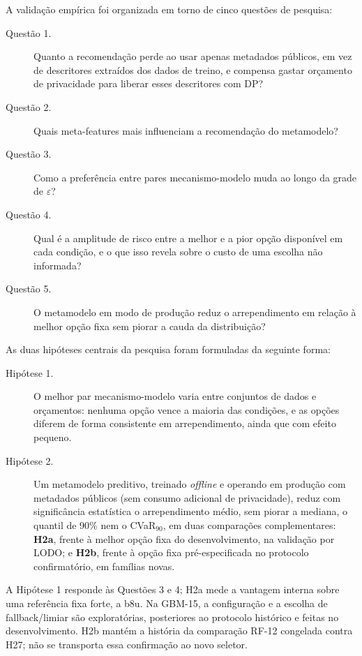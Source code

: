 A validação empírica foi organizada em torno de cinco questões de pesquisa:
\begin{description}
    \item[Questão 1.] Quanto a recomendação perde ao usar apenas metadados públicos, em vez de descritores extraídos dos dados de treino, e compensa gastar orçamento de privacidade para liberar esses descritores com DP?
    \item[Questão 2.] Quais meta-features mais influenciam a recomendação do metamodelo?
    \item[Questão 3.] Como a preferência entre pares mecanismo-modelo muda ao longo da grade de $\varepsilon$?
    \item[Questão 4.] Qual é a amplitude de risco entre a melhor e a pior opção disponível em cada condição, e o que isso revela sobre o custo de uma escolha não informada?
    \item[Questão 5.] O metamodelo em modo de produção reduz o arrependimento em relação à melhor opção fixa sem piorar a cauda da distribuição?
\end{description}

As duas hipóteses centrais da pesquisa foram formuladas da seguinte forma:
\begin{description}
    \item[Hipótese 1.] O melhor par mecanismo-modelo varia entre conjuntos de dados e orçamentos: nenhuma opção vence a maioria das condições, e as opções diferem de forma consistente em arrependimento, ainda que com efeito pequeno.
    \item[Hipótese 2.] Um metamodelo preditivo, treinado \textit{offline} e operando em produção com metadados públicos (sem consumo adicional de privacidade), reduz com significância estatística o arrependimento médio, sem piorar a mediana, o quantil de 90\% nem o CVaR$_{90}$, em duas comparações complementares: \textbf{H2a}, frente à melhor opção fixa do desenvolvimento, na validação por LODO; e \textbf{H2b}, frente à opção fixa pré-especificada no protocolo confirmatório, em famílias novas.
\end{description}

A Hipótese 1 responde às Questões 3 e 4; H2a mede a vantagem interna sobre uma referência fixa forte, a b8u. Na GBM-15, a configuração e a escolha de fallback/limiar são exploratórias, posteriores ao protocolo histórico e feitas no desenvolvimento. H2b mantém a história da comparação RF-12 congelada contra H27; não se transporta essa confirmação ao novo seletor.

